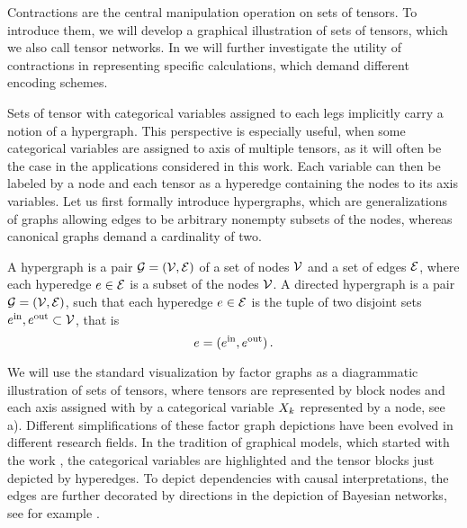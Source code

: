 \sect{\bncontractions}

Contractions are the central manipulation operation on sets of tensors.
To introduce them, we will develop a graphical illustration of sets of tensors, which we also call tensor networks.
In  we will further investigate the utility of contractions in representing specific calculations, which demand different encoding schemes.



Sets of tensor with categorical variables assigned to each legs implicitly carry a notion of a hypergraph.
This perspective is especially useful, when some categorical variables are assigned to axis of multiple tensors, as it will often be the case in the applications considered in this work.
Each variable can then be labeled by a node and each tensor as a hyperedge containing the nodes to its axis variables.
Let us first formally introduce hypergraphs, which are generalizations of graphs allowing edges to be arbitrary nonempty subsets of the nodes, whereas canonical graphs demand a cardinality of two.

\begin{definition}\label{def:hypergraphs}
	A hypergraph is a pair $\mathcal{G}=(\mathcal{V},\mathcal{E})$ of a set of nodes $\mathcal{V}$ and a set of edges $\mathcal{E}$, where each hyperedge $e\in\mathcal{E}$ is a subset of the nodes $\mathcal{V}$.
	A directed hypergraph is a pair $\mathcal{G}=(\mathcal{V},\mathcal{E})$, such that each hyperedge $e\in\mathcal{E}$ is the tuple of two disjoint sets $e^{\mathrm{in}},e^{\mathrm{out}}\subset\mathcal{V}$, that is
		\[ e = (e^{\mathrm{in}},e^{\mathrm{out}})  \, . \]
\end{definition}

We will use the standard visualization by factor graphs as a diagrammatic illustration of sets of tensors, where tensors are represented by block nodes and each axis assigned with by a categorical variable $X_{k}$ represented by a node, see a).
Different simplifications of these factor graph depictions have been evolved in different research fields.
In the tradition of graphical models, which started with the work \cite{pearl_probabilistic_1988}, the categorical variables are highlighted and the tensor blocks just depicted by hyperedges.
To depict dependencies with causal interpretations, the edges are further decorated by directions in the depiction of Bayesian networks, see for example \cite{pearl_causality_2009}.

